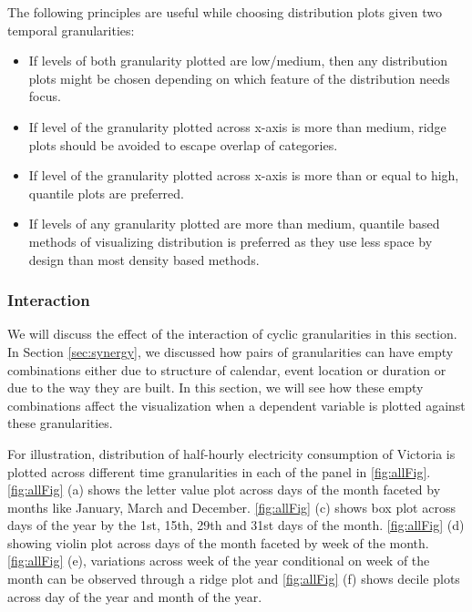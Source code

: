 \documentclass[12pt]{article}
\begin{document}
The following principles are useful while choosing distribution plots given two temporal granularities:

\begin{itemize}
\item
  If levels of both granularity plotted are low/medium, then any distribution plots might be chosen depending on which feature of the distribution needs focus.
\item
  If level of the granularity plotted across x-axis is more than medium, ridge plots should be avoided to escape overlap of categories.
\item
  If level of the granularity plotted across x-axis is more than or equal to high, quantile plots are preferred.
\item
  If levels of any granularity plotted are more than medium, quantile based methods of visualizing distribution is preferred as they use less space by design than most density based methods.
\end{itemize}

\hypertarget{interaction}{%
\subsubsection{Interaction}\label{interaction}}

We will discuss the effect of the interaction of cyclic granularities in this section. In Section \ref{sec:synergy}, we discussed how pairs of granularities can have empty combinations either due to structure of calendar, event location or duration or due to the way they are built. In this section, we will see how these empty combinations affect the visualization when a dependent variable is plotted against these granularities.

For illustration, distribution of half-hourly electricity consumption of Victoria is plotted across different time granularities in each of the panel in
\autoref{fig:allFig}. \autoref{fig:allFig} (a) shows the letter value plot across days of the month faceted by months like January, March and December. \autoref{fig:allFig} (c) shows box plot across days of the year by the 1st, 15th, 29th and 31st days of the month. \autoref{fig:allFig} (d) showing violin plot across days of the month faceted by week of the month. \autoref{fig:allFig} (e), variations across week of the year conditional on week of the month can be observed through a ridge plot and \autoref{fig:allFig} (f) shows decile plots across day of the year and month of the year.
\end{document}
